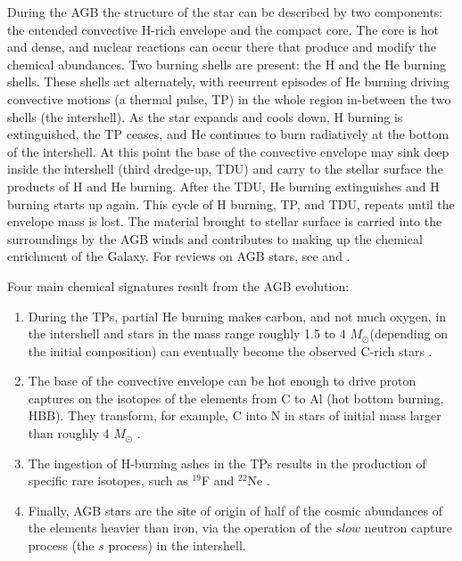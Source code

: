 \documentclass{iau}
\newcommand{\msun}{\ensuremath{{M}_{\odot}}}
\begin{document}
During the AGB the structure of the star can be described by two components: the 
entended convective H-rich envelope and the compact core. The core is hot and dense, 
and nuclear reactions can occur there that produce and modify the chemical 
abundances. Two burning shells are present: the H and the He burning shells. These shells 
act alternately, with recurrent episodes of He burning driving convective motions 
(a thermal pulse, TP) in the whole region in-between the two shells (the intershell). 
As the star expands and cools down, H burning is extinguished, the TP ceases, and He 
continues to burn radiatively at the bottom of the intershell. At this point the base of 
the convective envelope may sink deep inside the intershell (third dredge-up, TDU) 
and carry to the stellar surface the products of H and He burning. After the TDU, He 
burning extinguishes and H burning starts up again. This cycle of H burning, TP, and TDU, 
repeats until the envelope mass is lost. The material brought to stellar surface is 
carried into the surroundings by the AGB winds and contributes to making up the chemical 
enrichment of the Galaxy. For reviews on AGB stars, see 
\citet{herwig05} and \citet{karakas14dawes}.

Four main chemical signatures result from the AGB evolution:

\begin{enumerate}

\item{During the TPs, partial He burning makes carbon, and not much oxygen, in the 
intershell and stars in the mass range roughly 1.5 to 4 \msun (depending on the 
initial composition) can eventually become the observed C-rich stars 
\citep[see, e.g., the middle panels of Figs. 2-4 of][]{karakas16}.}

\item{The base of the convective envelope can be hot enough to drive proton captures 
on the isotopes of the elements from C to Al (hot bottom burning, HBB). They transform, 
for example, C into N in stars of initial mass larger than roughly 4 \msun  
\citep[see, e.g., the bottom panels of Figs. 2-4 of][]{karakas16}.}

\item{The ingestion of H-burning ashes in the TPs results in the production of specific 
rare isotopes, such as $^{19}$F and $^{22}$Ne \citep[e.g.,][]{lugaro04,abia15}.}

\item{Finally, AGB stars are the site of origin of half of the cosmic abundances of 
the elements heavier than iron, via the operation of the $slow$ neutron capture 
process (the $s$ process) in the intershell.}

\end{enumerate}
\end{document}
